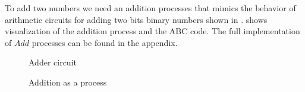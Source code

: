 To add two numbers we need an addition processes that mimics the behavior of arithmetic circuits for adding two bits binary numbers shown in 
.
 shows visualization of the addition process and the ABC code.
The full implementation of $Add$ processes can be found in the appendix.
\begin{figure}[H]%
\centering
{}
\caption{Adder circuit}
\label{tra_adder_circuit}%
\end{figure}


\begin{figure}[H]%
\centering
\hspace{\fill}
%
\hspace{1em}%
%
\vspace{2em}
%
\caption{Addition as a process}
\label{tra_addition}%
\end{figure}
